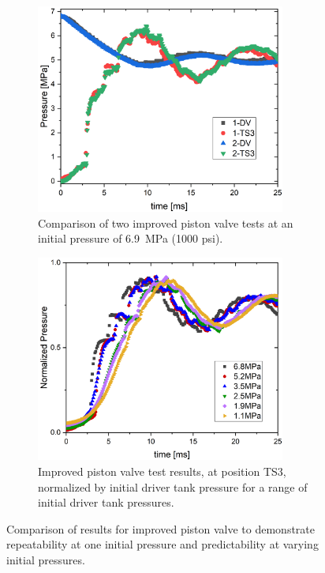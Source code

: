 \begin{figure}[htbp]
    \centering
    \begin{subfigure}[t]{0.45\textwidth}
        \centering
        \includegraphics[width=0.9\textwidth]{results/plots/1000psi_FFKM_Piston_2.png}
        \caption{Comparison of two improved piston valve tests at an initial pressure of \SI{6.9}{\mega\pascal} (1000 psi).}
        \label{fig:new piston 2 test}
    \end{subfigure}
    \hfill
    \begin{subfigure}[t]{0.45\textwidth}
        \centering
        \includegraphics[width=0.9\textwidth]{results/plots/norm_FFKM.png}
        \caption{Improved piston valve test results, at position TS3, normalized by initial driver tank pressure for a range of initial driver tank pressures.}
        \label{fig:new norm}
    \end{subfigure}
    \caption{Comparison of results for improved piston valve to demonstrate repeatability at one initial pressure and predictability at varying initial pressures.}
    \label{fig:new piston repeatability}
\end{figure}

